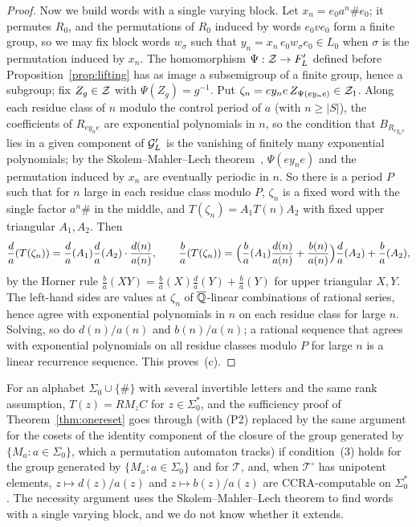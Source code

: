 \begin{proof}
Now we build words with a single varying block. Let $x_n=e_0a^n\#e_0$; it permutes $R_0$, and the permutations of $R_0$ induced by words $e_0ve_0$ form a finite group, so we may fix block words $w_\sigma$ such that $y_n=x_n\,e_0w_{\sigma}e_0\in L_0$ when $\sigma$ is the permutation induced by $x_n$. The homomorphism $\Psi:\mathcal{Z}\to F'_L$ defined before Proposition~\ref{prop:lifting} has as image a subsemigroup of a finite group, hence a subgroup; fix $Z_g\in\mathcal{Z}$ with $\Psi(Z_g)=g^{-1}$. Put $\zeta_n=ey_ne\,Z_{\Psi(ey_ne)}\in\mathcal{Z}_1$. Along each residue class of $n$ modulo the control period of $a$ (with $n\ge|S|$), the coefficients of $R_{ey_ne}$ are exponential polynomials in $n$, so the condition that $B_{R_{ey_ne}}$ lies in a given component of $\mathcal{G}'_L$ is the vanishing of finitely many exponential polynomials; by the Skolem--Mahler--Lech theorem~\cite{EPSW03}, $\Psi(ey_ne)$ and the permutation induced by $x_n$ are eventually periodic in $n$. So there is a period $P$ such that for $n$ large in each residue class modulo $P$, $\zeta_n$ is a fixed word with the single factor $a^n\#$ in the middle, and $T(\zeta_n)=A_1T(n)A_2$ with fixed upper triangular $A_1,A_2$. Then
\[
\frac{d}{a}(T(\zeta_n))=\frac da(A_1)\frac da(A_2)\cdot\frac{d(n)}{a(n)},\qquad
\frac ba(T(\zeta_n))=\Bigl(\frac ba(A_1)\frac{d(n)}{a(n)}+\frac{b(n)}{a(n)}\Bigr)\frac da(A_2)+\frac ba(A_2),
\]
by the Horner rule $\frac ba(XY)=\frac ba(X)\frac da(Y)+\frac ba(Y)$ for upper triangular $X,Y$. The left-hand sides are values at $\zeta_n$ of $\overline{\mathbb{Q}}$-linear combinations of rational series, hence agree with exponential polynomials in $n$ on each residue class for large $n$. Solving, so do $d(n)/a(n)$ and $b(n)/a(n)$; a rational sequence that agrees with exponential polynomials on all residue classes modulo $P$ for large $n$ is a linear recurrence sequence. This proves~(c).
\end{proof}

\begin{remark}\label{rem:severalletters}
For an alphabet $\Sigma_0\cup\{\#\}$ with several invertible letters and the same rank assumption, $T(z)=RM_zC$ for $z\in\Sigma_0^*$, and the sufficiency proof of Theorem~\ref{thm:onereset} goes through (with (P2) replaced by the same argument for the cosets of the identity component of the closure of the group generated by $\{M_a:a\in\Sigma_0\}$, which a permutation automaton tracks) if condition~(3) holds for the group generated by $\{M_a:a\in\Sigma_0\}$ and for $\mathcal T$, and, when $\mathcal T^\circ$ has unipotent elements, $z\mapsto d(z)/a(z)$ and $z\mapsto b(z)/a(z)$ are CCRA-computable on $\Sigma_0^*$. The necessity argument uses the Skolem--Mahler--Lech theorem to find words with a single varying block, and we do not know whether it extends.
\end{remark}

